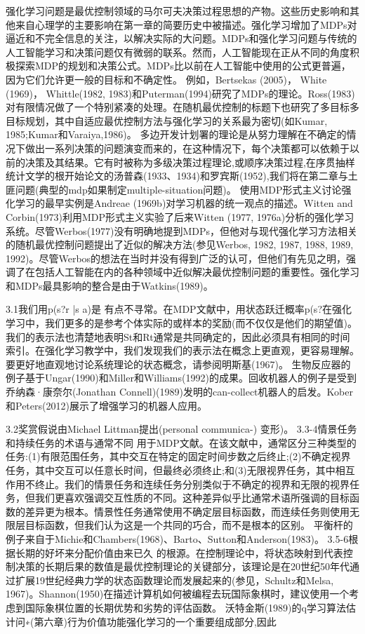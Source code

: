 强化学习问题是最优控制领域的马尔可夫决策过程思想的产物。这些历史影响和其他来自心理学的主要影响在第一章的简要历史中被描述。强化学习增加了MDPs对逼近和不完全信息的关注，以解决实际的大问题。MDPs和强化学习问题与传统的人工智能学习和决策问题仅有微弱的联系。然而，人工智能现在正从不同的角度积极探索MDP的规划和决策公式。MDPs比以前在人工智能中使用的公式更普遍，因为它们允许更一般的目标和不确定性。
例如，Bertsekas (2005)， White (1969)， Whittle(1982, 1983)和Puterman(1994)研究了MDPs的理论。Ross(1983)对有限情况做了一个特别紧凑的处理。在随机最优控制的标题下也研究了多目标多目标规划，其中自适应最优控制方法与强化学习的关系最为密切(如Kumar, 1985;Kumar和Varaiya,1986)。
多边开发计划署的理论是从努力理解在不确定的情况下做出一系列决策的问题演变而来的，在这种情况下，每个决策都可以依赖于以前的决策及其结果。它有时被称为多级决策过程理论,或顺序决策过程,在序贯抽样统计文学的根开始论文的汤普森(1933、1934)和罗宾斯(1952),我们将在第二章与土匪问题(典型的mdp如果制定multiple-situation问题)。
使用MDP形式主义讨论强化学习的最早实例是Andreae (1969b)对学习机器的统一观点的描述。Witten and Corbin(1973)利用MDP形式主义实验了后来Witten (1977, 1976a)分析的强化学习系统。尽管Werbos(1977)没有明确地提到MDPs，但他对与现代强化学习方法相关的随机最优控制问题提出了近似的解决方法(参见Werbos, 1982, 1987, 1988, 1989, 1992)。尽管Werbos的想法在当时并没有得到广泛的认可，但他们有先见之明，强调了在包括人工智能在内的各种领域中近似解决最优控制问题的重要性。强化学习和MDPs最具影响的整合是由于Watkins(1989)。

3.1我们用p(s?r |s a)是
有点不寻常。在MDP文献中，用状态跃迁概率p(s?在强化学习中，我们更多的是参考个体实际的或样本的奖励(而不仅仅是他们的期望值)。我们的表示法也清楚地表明St和Rt通常是共同确定的，因此必须具有相同的时间索引。在强化学习教学中，我们发现我们的表示法在概念上更直观，更容易理解。
要更好地直观地讨论系统理论的状态概念，请参阅明斯基(1967)。
生物反应器的例子基于Ungar(1990)和Miller和Williams(1992)的成果。回收机器人的例子是受到乔纳森·康奈尔(Jonathan Connell)(1989)发明的can-collect机器人的启发。Kober和Peters(2012)展示了增强学习的机器人应用。

3.2奖赏假说由Michael Littman提出(personal communica-)
变形)。
3.3-4情景任务和持续任务的术语与通常不同
用于MDP文献。在该文献中，通常区分三种类型的任务:(1)有限范围任务，其中交互在特定的固定时间步数之后终止;(2)不确定视界任务，其中交互可以任意长时间，但最终必须终止;和(3)无限视界任务，其中相互作用不终止。我们的情景任务和连续任务分别类似于不确定的视界和无限的视界任务，但我们更喜欢强调交互性质的不同。这种差异似乎比通常术语所强调的目标函数的差异更为根本。情景性任务通常使用不确定层目标函数，而连续任务则使用无限层目标函数，但我们认为这是一个共同的巧合，而不是根本的区别。
平衡杆的例子来自于Michie和Chambers(1968)、Barto、Sutton和Anderson(1983)。
3.5-6根据长期的好坏来分配价值由来已久
的根源。在控制理论中，将状态映射到代表控制决策的长期后果的数值是最优控制理论的关键部分，该理论是在20世纪50年代通过扩展19世纪经典力学的状态函数理论而发展起来的(参见，Schultz和Melsa, 1967)。Shannon(1950)在描述计算机如何被编程去玩国际象棋时，建议使用一个考虑到国际象棋位置的长期优势和劣势的评估函数。
沃特金斯(1989)的q学习算法估计问∗(第六章)行为价值功能强化学习的一个重要组成部分,因此

